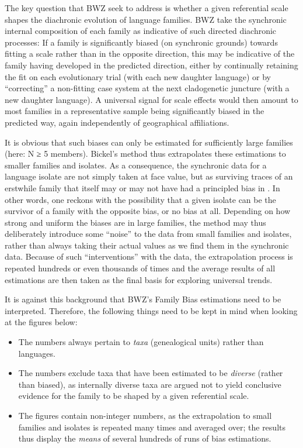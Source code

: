 \documentclass[output=paper]{langscibook}
\begin{document}
The key question that  BWZ  seek to address is whether a given referential scale shapes the diachronic evolution of language families. BWZ take the synchronic internal composition of each family as indicative of such directed diachronic processes: If a family is significantly biased (on synchronic grounds) towards fitting a scale rather than in the opposite direction, this may be indicative of the family having developed in the predicted direction, either by continually retaining the fit on each evolutionary trial (\ie with each new daughter language) or by “correcting” a non-fitting case system at the next cladogenetic juncture (\ie with a new daughter language). A universal signal for scale effects would then amount to most families in a representative sample being significantly biased in the predicted way, again independently of geographical affiliations.

It is obvious that such biases can only be estimated for sufficiently large families (here: N ≥ 5 members). Bickel’s method thus extrapolates these estimations to smaller families and isolates. As a consequence, the synchronic data for a language isolate are not simply taken at face value, but as surviving traces of an erstwhile family that itself may or may not have had a principled bias in . In other words, one reckons with the possibility that a given isolate can be the survivor of a family with the opposite bias, or no bias at all. Depending on how strong and uniform the biases are in large families, the method may thus deliberately introduce some “noise” to the data from small families and isolates, rather than always taking their actual values as we find them in the synchronic data. Because of such “interventions” with the data, the extrapolation process is repeated hundreds or even thousands of times and the average results of all estimations are then taken as the final basis for exploring universal trends.

It is against this background that BWZ’s Family Bias estimations need to be interpreted. Therefore, the following things need to be kept in mind when looking at the figures below:

\begin{itemize}
\item The numbers always pertain to \textit{taxa} (\ie genealogical units) rather than languages.
\item The numbers exclude taxa that have been estimated to be \textit{diverse} (rather than biased), as internally diverse taxa are argued not to yield conclusive evidence for the family to be shaped by a given referential scale.
\item The figures contain non-integer numbers, as the extrapolation to small families and isolates is repeated many times and averaged over; the results thus display the \textit{means} of several hundreds of runs of bias estimations.
\end{itemize}
\end{document}
